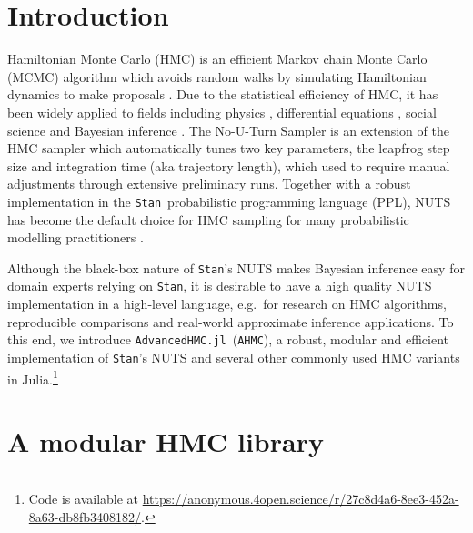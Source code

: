 \documentclass[tablecaption=bottom,wcp]{jmlr} %
\def\ahmc{\texttt{AHMC}}
\def\ahmcfull{\texttt{AdvancedHMC.jl}}
\def\stan{\texttt{Stan}}
\begin{document}
\section{Introduction}
\label{sec:intro}

Hamiltonian Monte Carlo (HMC) is an efficient Markov chain Monte Carlo (MCMC) algorithm which avoids random walks by simulating Hamiltonian dynamics to make proposals \citep{duane1987hybrid,neal2011mcmc}. Due to the statistical efficiency of HMC, it has been widely applied to fields including physics \citep{duane1987hybrid}, differential equations \citep{kramer2014hamiltonian}, social science \citep{jackman2009bayesian} and Bayesian inference \citep[e.g. Bayesian neural networks;][]{neal2012bayesian}. The No-U-Turn Sampler \citep[NUTS;][]{hoffman2014no} is an extension of the HMC sampler which automatically tunes two key parameters, the leapfrog step size and integration time (aka trajectory length), which used to require manual adjustments through extensive preliminary runs. Together with a robust implementation in the \stan\, probabilistic programming language (PPL), NUTS has become the default choice for HMC sampling for many probabilistic modelling practitioners \citep{carpenter2017stan}.


Although the black-box nature of \stan's NUTS makes Bayesian inference easy for domain experts relying on %
\stan, it is desirable to have a high quality NUTS implementation in a high-level language, 
e.g.~for research on HMC algorithms, reproducible comparisons and real-world approximate inference applications. To this end, we introduce \ahmcfull ~(\ahmc), a robust, modular and efficient implementation of \stan's NUTS and several other commonly used HMC variants in Julia.\footnote{Code is available at \url{https://anonymous.4open.science/r/27c8d4a6-8ee3-452a-8a63-db8fb3408182/}.}

\section{A modular HMC library}
\end{document}
